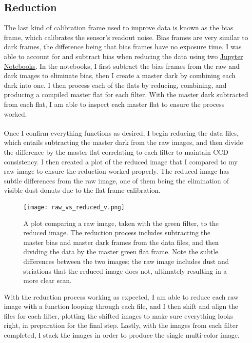 \documentclass[]{aastex63}
\begin{document}
\subsection{Reduction}
The last kind of calibration frame used to improve data is known as the bias frame, which calibrates the sensor's readout noise. Bias frames are very similar to dark frames, the difference being that bias frames have no exposure time. I was able to account for and subtract bias when reducing the data using two \href{https://github.com/mariahjones/ASTR240_MCI}{Jupyter Notebooks}. In the notebooks, I first subtract the bias frames from the raw and dark images to eliminate bias, then I create a master dark by combining each dark into one. I then process each of the flats by reducing, combining, and producing a compiled master flat for each filter. With the master dark subtracted from each flat, I am able to inspect each master flat to ensure the process worked.
\\
\\
Once I confirm everything functions as desired, I begin reducing the data files, which entails subtracting the master dark from the raw images, and then divide the difference by the master flat correlating to each filter to maintain CCD consistency. I then created a plot of the reduced image that I compared to my raw image to ensure the reduction worked properly. The reduced image has subtle differences from the raw image, one of them being the elimination of visible dust donuts due to the flat frame calibration.

\begin{figure}[h]
    \centering
    \texttt{[image: raw\_vs\_reduced\_v.png]}
    \caption{A plot comparing a raw image, taken with the green filter, to the reduced image. The reduction process includes subtracting the master bias and master dark frames from the data files, and then dividing the data by the master green flat frame. Note the subtle differences between the two images; the raw image includes dust and striations that the reduced image does not, ultimately resulting in a more clear scan.}
    \label{fig:comparison}
\end{figure}

With the reduction process working as expected, I am able to reduce each raw image with a function looping through each file, and I then shift and align the files for each filter, plotting the shifted images to make sure everything looks right, in preparation for the final step. Lastly, with the images from each filter completed, I stack the images in order to produce the single multi-color image.
\end{document}
